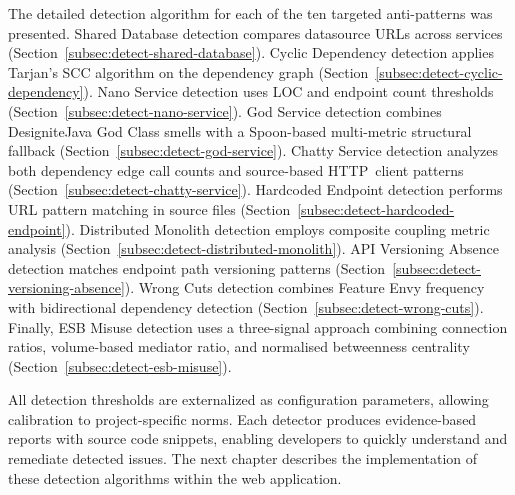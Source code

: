 The detailed detection algorithm for each of the ten targeted anti-patterns was presented. Shared Database detection compares datasource URLs across services (Section~\ref{subsec:detect-shared-database}). Cyclic Dependency detection applies Tarjan's SCC algorithm on the dependency graph (Section~\ref{subsec:detect-cyclic-dependency}). Nano Service detection uses LOC and endpoint count thresholds (Section~\ref{subsec:detect-nano-service}). God Service detection combines DesigniteJava God Class smells with a Spoon-based multi-metric structural fallback (Section~\ref{subsec:detect-god-service}). Chatty Service detection analyzes both dependency edge call counts and source-based HTTP~client patterns (Section~\ref{subsec:detect-chatty-service}). Hardcoded Endpoint detection performs URL pattern matching in source files (Section~\ref{subsec:detect-hardcoded-endpoint}). Distributed Monolith detection employs composite coupling metric analysis (Section~\ref{subsec:detect-distributed-monolith}). API Versioning Absence detection matches endpoint path versioning patterns (Section~\ref{subsec:detect-versioning-absence}).
Wrong Cuts detection combines Feature Envy frequency with bidirectional dependency detection (Section~\ref{subsec:detect-wrong-cuts}). Finally, ESB Misuse detection uses a three-signal approach combining connection ratios, volume-based mediator ratio, and normalised betweenness centrality (Section~\ref{subsec:detect-esb-misuse}).

All detection thresholds are externalized as configuration parameters, allowing calibration to project-specific norms. Each detector produces evidence-based reports with source code snippets, enabling developers to quickly understand and remediate detected issues. The next chapter describes the implementation of these detection algorithms within the web application.
